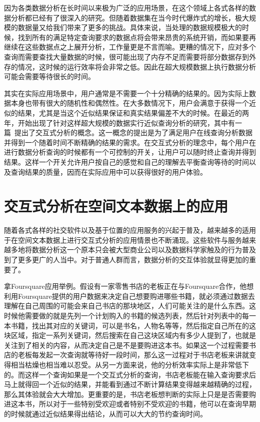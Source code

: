 因为各类数据分析在长时间以来极为广泛的应用场景，在这个领域上各式各样的数据分析都已经有了很深入的研究。但随着数据集在当今时代爆炸式的增长，极大规模的数据量又给我们带来了更多的挑战。具体来说，当处理的数据规模极大的时候，找到所有的满足特定查询要求的数据点将会带来昂贵的系统开销，而如果要再继续在这些数据点之上展开分析，工作量更是不言而喻。更糟的情况下，应对多个查询而需要查找大量数据的时候，很可能出现了内存不足而需要将部分数据存到外存的情况，这时候的运行效率将会非常之低。因此在超大规模数据上执行数据分析可能会需要等待很长的时间。

其实在实际应用场景中，用户通常是不需要一个十分精确的结果的。因为实际上数据本身也带有很大的随机性和偶然性。在大多数情况下，用户会满意于获得一个近似的结果，尤其是当这个近似结果保证和真实结果偏差不大的时候。在最近的两年，开始出现了针对这样超大规模的数据实行近似查询分析的研究，其中有一篇~\cite{RS}提出了交互式分析的概念。这一概念的提出是为了满足用户在线查询分析数据并得到一个随着时间不断精确的结果的需求。在交互式分析的理念中，每个用户在进行数据分析查询的时候都有一个可控制的开关，让用户可以随时终止查询并得到结果。这样一个开关允许用户按自己的感觉和自己的理解去平衡查询等待的时间以及查询结果的质量，因而在实际应用中可以获得很好的用户体验。

\section{交互式分析在空间文本数据上的应用}

随着各式各样的社交软件以及基于位置的应用服务的兴起于普及，越来越多的适用于在空间文本数据上进行交互式分析的应用情景也不断涌现。这些软件与服务越来越多地将数据分析这一个原本只会被大型商业公司以及数据科学家触及的行为普及到了更多更广的人当中。对于普通人群而言，数据分析的交互体验就显得更加的重要了。

拿Foursquare应用举例。假设有一家零售书店的老板正在与Foursquare合作，他想利用Foursquare提供的用户数据来决定自己想要购进哪些书籍，就必须通过数据去理解在自己周围的可能会来自己书店的那块地区，人们可能关注的是什么东西。这时候他需要做的就是先列一个计划购入的书籍的候选列表，然后针对列表中的每一本书籍，找出其对应的关键词，可以是书名，人物名等等，然后指定自己所在的这块区域，指定一系列关键词，然后搜索在自己这块区域内有多少人提到了，也就是关注到了相关的内容，从而决定自己是不是要购进这本书。如果这一个过程需要书店的老板每发起一次查询就等待好一段时间，那么这一过程对于书店老板来讲就变得相当枯燥也相当难以忍受。从另一方面来说，他的分析效率实际上是非常低下的。而这样一个查询如果是一个交互式分析的查询，书店老板能在输入查询要求后马上就得回一个近似的结果，并能看到通过不断计算结果变得越来越精确的过程，那么其体验就会大大增加。更重要的是，书店老板想判断的实际上只是是否需要购进这本书，所以对于一些特别受欢迎或者特别不受欢迎的书籍，他可以在查询早期的时候就通过近似结果得出结论，从而可以大大的节约查询时间。


